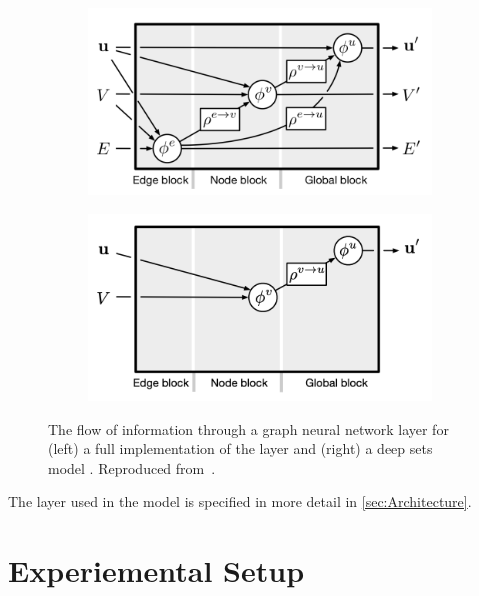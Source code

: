 \begin{figure}[!htbp]
    \centering
    \begin{subfigure}[b]{0.48\textwidth}
        \centering
        \includegraphics[width=\textwidth]{chapters/gnn_tagger/figs/gn_full.png}
    \end{subfigure}
    \quad
    \begin{subfigure}[b]{0.48\textwidth}
        \centering
        \includegraphics[width=\textwidth]{chapters/gnn_tagger/figs/gn_deepset.png}
    \end{subfigure}
    \caption{
        The flow of information through a graph neural network layer for (left) a full implementation of the layer and (right) a deep sets model \cite{zaheer2018deep}.
        Reproduced from~.
    }
    \label{fig:gnn_net_diags}
\end{figure}

The layer used in the \GNN model is specified in more detail in \cref{sec:Architecture}.


\section{Experiemental Setup}\label{sec:experimental_setup}

